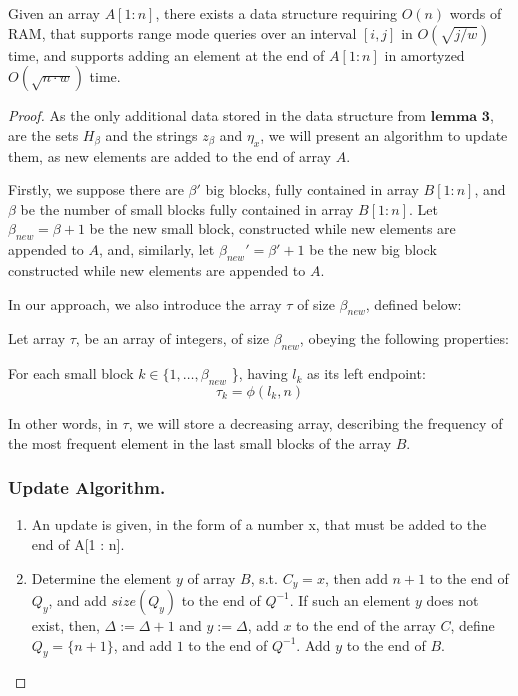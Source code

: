 \documentclass[runningheads]{llncs}
\begin{document}
\begin{lemma}
    Given an array $A[1:n]$, there exists a data structure requiring $O(n)$ words of RAM, that supports 
    range mode queries over an interval $[i,j]$ in $O( \sqrt{j/w}  )$ time, and supports adding an element at the end of $A[1:n]$ in amortyzed $O(\sqrt{n \cdot w})$ time. 
\end{lemma}
\begin{proof}
    As the only additional data stored in the data structure from $\textbf{lemma 3}$, are the sets $H_{\beta}$ and the strings $z_{\beta}$ and $\eta_x$, 
    we will present an algorithm to update them, as new elements are added to the end of array $A$.
    
    Firstly, we suppose there are $\beta'$ big blocks, fully contained in array $B[1:n]$, 
    and $\beta$ be the number of small blocks fully contained in array $B[1:n]$.
    Let $\beta_{new} = \beta+1$ be the new small block, constructed while new elements are appended to $A$,
    and, similarly, let $\beta_{new}'=\beta'+1$ be the new big block constructed while new elements are appended to $A$.                


    In our approach, we also introduce the array $\tau$ of size $\beta_{new}$, defined below:
    \begin{definition}
        Let array $\tau$, be an array of integers, of size $\beta_{new}$, obeying the following properties:
        \begin{property}
            For each small block $k \in \{1,\dots , \beta_{new}$ \}, having $l_k$ as its left endpoint:
            \[
            \tau_k = \phi(l_k, n)
            \] 
        \end{property}
    \end{definition}

    In other words, in $\tau$, we will store a decreasing array, describing the frequency 
    of the most frequent element in the last small blocks of the array $B$.

    \subsubsection{Update Algorithm.} 
    
    \begin{enumerate}
        \item[] An update is given, in the form of a number x, that must be added to the
        end of A[1 : n].
        
        \item Determine the element $y$ of array $B$, s.t. $C_{y}=x$, then add $n+1$ to the end of $Q_{y}$, and add $size(Q_{y})$ to the end of $Q^{-1}$.
        If such an element $y$ does not exist, then, $\Delta := \Delta+1$ and $y:=\Delta$, 
        add $x$ to the end of the array $C$, define $Q_{y}=\{n+1\}$, and add $1$ to the end of $Q^{-1}$. Add $y$ to the end of $B$. 
        

\end{enumerate}
\end{proof}
\end{document}
